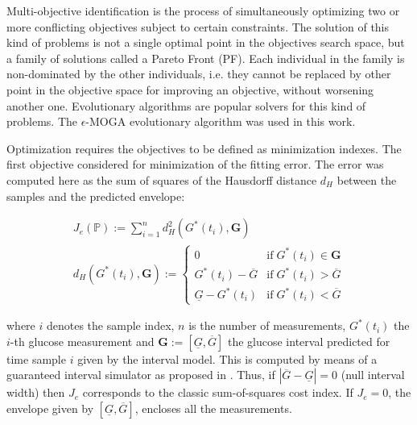 Multi-objective identification is the process of simultaneously optimizing two or more conflicting objectives subject to certain constraints. The solution of this kind of problems is not a single optimal point in the objectives search space, but a family of solutions called a Pareto Front (PF). Each individual in the family is non-dominated by the other individuals, i.e. they cannot be replaced by other point in the objective space for improving an objective, without worsening another one. Evolutionary algorithms are popular solvers for this kind of problems. The $\epsilon$-MOGA evolutionary algorithm \cite{herrero2007well} was used in this work.

Optimization requires the objectives to be defined as minimization indexes. The first objective considered for minimization of the fitting error. The error was computed here as the sum of squares of the Hausdorff distance $d_H$ between the samples and the predicted envelope: 

	\begin{gather}
	J_e(\mathbb{P}):=\sum\limits_{i=1}^n d_H^2 \left( G^{\ast}(t_i), \boldsymbol{G} \right) \label{eq:jota1} \\
	d_H \left( G^{\ast}(t_i), \boldsymbol{G} \right):=
	\begin{cases}
	0 & \text{if} \; G^{\ast}(t_i) \in \boldsymbol{G} \\
	G^{\ast}(t_i)-\overline{G}  & \text{if} \; G^{\ast}(t_i) > \overline{G}  \\
	\underline{G} -G^{\ast}(t_i) & \text{if} \; G^{\ast}(t_i) < \overline{G} 
	\label{eq:jota12}
	\end{cases}
	\end{gather}

where $i$ denotes the sample index, $n$ is the number of measurements, $G^{\ast}(t_i)$ the $i$-th glucose measurement and $ \boldsymbol{G} := \left[ \underline{G},\overline{G} \right]$ the glucose interval predicted for time sample $i$ given by the interval model. This is computed by means of a guaranteed interval simulator as proposed in \cite{calm2010comparison}. Thus, if $\left| \overline{G} - \underline{G} \right| = 0 $ (null interval width) then $J_e$ corresponds to the classic sum-of-squares cost index. If $J_e=0$, the envelope given by $[\underline{G},\overline{G}]$, encloses all the measurements. 

